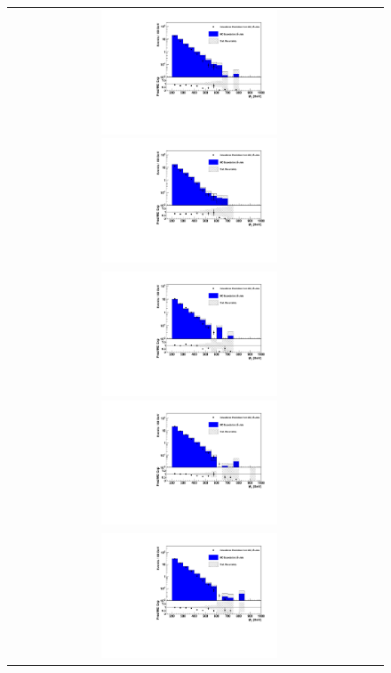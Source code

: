 \begin{figure}[tbhn]
\begin{center}
\begin{tabular}{cc}
\includegraphics[width=0.50\textwidth]{lostlepton/plots/closure/MHTttbarIsoMu.pdf} 
\includegraphics[width=0.50\textwidth]{lostlepton/plots/closure/MHTttbarIsoE.pdf} \\
\includegraphics[width=0.50\textwidth]{lostlepton/plots/closure/MHTttbarRecoMu.pdf}
\includegraphics[width=0.50\textwidth]{lostlepton/plots/closure/MHTttbarRecoE.pdf}\\
\includegraphics[width=0.50\textwidth]{lostlepton/plots/closure/MHTttbarAccMu.pdf}

\end{tabular}
\end{center}
\end{figure}
